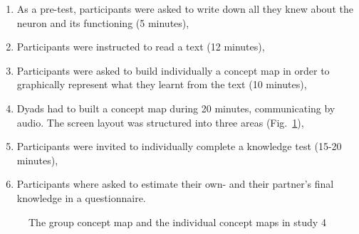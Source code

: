 \documentclass[natbib]{svjour3}
\begin{document}
\begin{enumerate}

    \item As a pre-test, participants were asked to write down all they knew
        about the neuron and its functioning (5 minutes),

    \item Participants were instructed to read a text (12 minutes),

    \item Participants were asked to build individually a concept map in order to
        graphically represent what they learnt from the text (10 minutes),

    \item Dyads had to built a concept map during 20 minutes, communicating by
        audio.  The screen layout was structured into three areas
        (Fig.~\ref{study4:concept_map}),

    \item Participants were invited to individually complete a knowledge test
        (15-20 minutes),

    \item Participants where asked to estimate their own- and their partner's
        final knowledge in a questionnaire. 

\end{enumerate}



\begin{figure}
    \centering
    \caption{The group concept map and the individual concept maps in study
    4}
    \label{study4:concept_map}
\end{figure}
\end{document}
